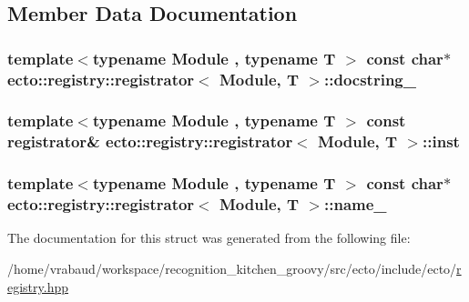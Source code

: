 \subsection{\-Member \-Data \-Documentation}
\hypertarget{structecto_1_1registry_1_1registrator_a6eb361c892595a3d71ab627829c07bdb}{
\subsubsection[{docstring\-\_\-}]{\setlength{\rightskip}{0pt plus 5cm}template$<$typename Module , typename T $>$ const char$\ast$ {\bf ecto\-::registry\-::registrator}$<$ \-Module, \-T $>$\-::{\bf docstring\-\_\-}}}\label{structecto_1_1registry_1_1registrator_a6eb361c892595a3d71ab627829c07bdb}
\hypertarget{structecto_1_1registry_1_1registrator_a0b0f6e3aa1718476b962a007786e7496}{
\subsubsection[{inst}]{\setlength{\rightskip}{0pt plus 5cm}template$<$typename Module , typename T $>$ const {\bf registrator}\& {\bf ecto\-::registry\-::registrator}$<$ \-Module, \-T $>$\-::{\bf inst}}}\label{structecto_1_1registry_1_1registrator_a0b0f6e3aa1718476b962a007786e7496}
\hypertarget{structecto_1_1registry_1_1registrator_a794acc964cefc0a374129823b4ee5246}{
\subsubsection[{name\-\_\-}]{\setlength{\rightskip}{0pt plus 5cm}template$<$typename Module , typename T $>$ const char$\ast$ {\bf ecto\-::registry\-::registrator}$<$ \-Module, \-T $>$\-::{\bf name\-\_\-}}}\label{structecto_1_1registry_1_1registrator_a794acc964cefc0a374129823b4ee5246}


\-The documentation for this struct was generated from the following file\-:\begin{DoxyCompactItemize}
\item 
/home/vrabaud/workspace/recognition\-\_\-kitchen\-\_\-groovy/src/ecto/include/ecto/\hyperlink{registry_8hpp}{registry.\-hpp}\end{DoxyCompactItemize}
